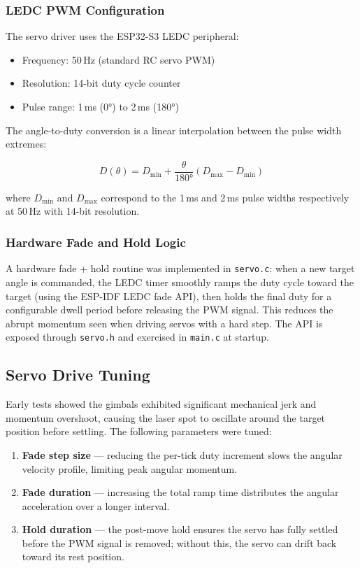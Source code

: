 \documentclass[12pt]{article}
\begin{document}
\subsubsection{LEDC PWM Configuration}

The servo driver uses the ESP32-S3 LEDC peripheral:

\begin{itemize}
  \item Frequency: 50\,Hz (standard RC servo PWM)
  \item Resolution: 14-bit duty cycle counter
  \item Pulse range: 1\,ms (0°) to 2\,ms (180°)
\end{itemize}

The angle-to-duty conversion is a linear interpolation between the pulse width
extremes:

\begin{equation}
  D(\theta) = D_{\min} + \frac{\theta}{180°}\left(D_{\max} - D_{\min}\right)
  \label{eq:servo_duty}
\end{equation}

where $D_{\min}$ and $D_{\max}$ correspond to the 1\,ms and 2\,ms pulse widths
respectively at 50\,Hz with 14-bit resolution.

\subsubsection{Hardware Fade and Hold Logic}

A hardware fade + hold routine was implemented in \texttt{servo.c}: when a new
target angle is commanded, the LEDC timer smoothly ramps the duty cycle toward
the target (using the ESP-IDF LEDC fade API), then holds the final duty for a
configurable dwell period before releasing the PWM signal.  This reduces the
abrupt momentum seen when driving servos with a hard step.  The API is exposed
through \texttt{servo.h} and exercised in \texttt{main.c} at startup.

\subsection{Servo Drive Tuning}

Early tests showed the gimbals exhibited significant mechanical jerk and
momentum overshoot, causing the laser spot to oscillate around the target
position before settling.  The following parameters were tuned:

\begin{enumerate}
  \item \textbf{Fade step size} --- reducing the per-tick duty increment slows
        the angular velocity profile, limiting peak angular momentum.
  \item \textbf{Fade duration} --- increasing the total ramp time distributes
        the angular acceleration over a longer interval.
  \item \textbf{Hold duration} --- the post-move hold ensures the servo has
        fully settled before the PWM signal is removed; without this, the servo
        can drift back toward its rest position.
\end{enumerate}
\end{document}
